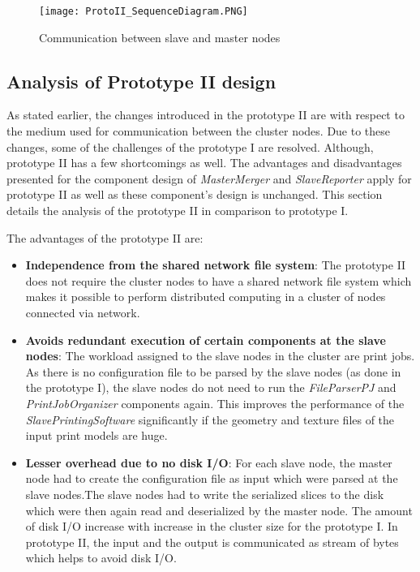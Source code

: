 \begin{figure}[!t]
\centering
\texttt{[image: ProtoII\_SequenceDiagram.PNG]}
\caption{Communication between slave and master nodes}
\label{fig:ProtoII}
\end{figure}

\subsection{Analysis of Prototype II design}

As stated earlier, the changes introduced in the prototype II are with respect to the medium used for communication between the cluster nodes. Due to these changes, some of the challenges of the prototype I are resolved. Although, prototype II has a few shortcomings as well. The advantages and disadvantages presented for the component design of \textit{MasterMerger} and \textit{SlaveReporter} apply for prototype II as well as these component's design is unchanged. This section details the analysis of the  prototype II in comparison to prototype I. 

The advantages of the prototype II are:
\begin{itemize}
\item \textbf{Independence from the shared network file system}: The prototype II does not require the cluster nodes to have a shared network file system which makes it possible to perform distributed computing in a cluster of nodes connected via network. 
\item \textbf{Avoids redundant execution of certain components at the slave nodes}: The workload assigned to the slave nodes in the cluster are print jobs. As there is no configuration file to be parsed by the slave nodes (as done in the prototype I), the slave nodes do not need to run the \textit{FileParserPJ} and \textit{PrintJobOrganizer} components again. This improves the performance of the \textit{SlavePrintingSoftware} significantly if the geometry and texture files of the input print models are huge.   
\item \textbf{Lesser overhead due to no disk I/O}: For each slave node, the master node had to create the configuration file as input which were parsed at the slave nodes.The slave nodes had to write the serialized slices to the disk which were then again read and deserialized by the master node. The amount of disk I/O increase with increase in the cluster size for the prototype I. In prototype II, the input and the output is communicated as stream of bytes which helps to avoid disk I/O.
\end{itemize}

